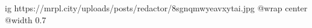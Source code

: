 
 
 
 
 

\ifcmt
  ig https://mrpl.city/uploads/posts/redactor/8sgnqmwyeavxytai.jpg
  @wrap center
  @width 0.7
\fi
